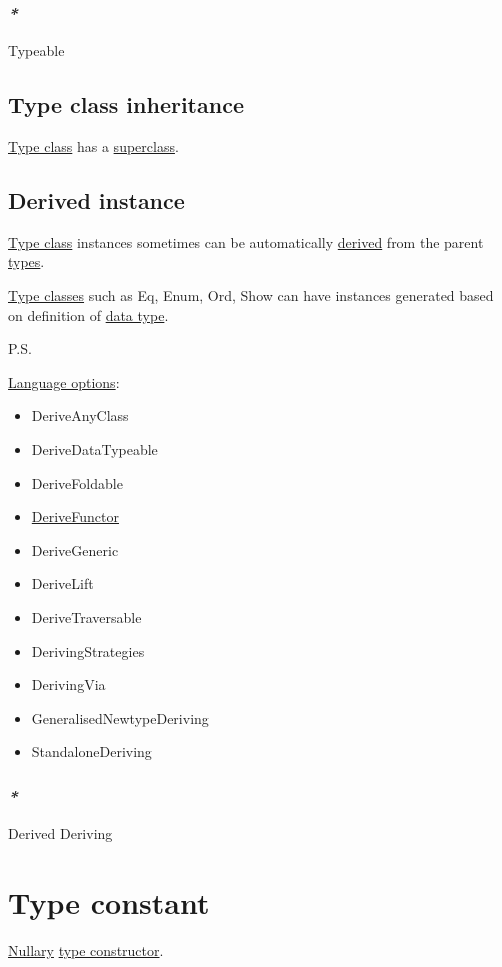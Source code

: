 \documentclass[a4paper,14pt,oneside]{book}
\begin{document}
\subsubsection{\emph{*}}
\label{sec:org92069bd}

\label{org07a84b8}Typeable

\subsection{\label{org713e59c}Type class inheritance}
\label{sec:org3487b38}
\hyperref[org4b105c4]{Type class} has a \hyperref[org59e8c99]{superclass}.

\subsection{\label{org900a543}Derived instance}
\label{sec:orgedd5889}
\hyperref[org4b105c4]{Type class} instances sometimes can be automatically \hyperref[orga2abed2]{derived} from the parent \hyperref[org91cf53a]{types}.

\hyperref[org66bce48]{Type classes} such as Eq, Enum, Ord, Show can have instances generated based on definition of \hyperref[org89def2c]{data type}.

P.S.

\hyperref[org3fd5452]{Language options}:
\begin{itemize}
\item DeriveAnyClass
\item DeriveDataTypeable
\item DeriveFoldable
\item \hyperref[org026c96d]{DeriveFunctor}
\item DeriveGeneric
\item DeriveLift
\item DeriveTraversable
\item DerivingStrategies
\item DerivingVia
\item GeneralisedNewtypeDeriving
\item StandaloneDeriving
\end{itemize}

\subsubsection{\emph{*}}
\label{sec:org1c85112}

\label{orga2abed2}Derived
\label{org58a3629}Deriving

\section{\label{orgbeeb655}Type constant}
\label{sec:orgcf4548f}
\hyperref[orga8b235e]{Nullary} \hyperref[orgb31668f]{type constructor}.
\end{document}
